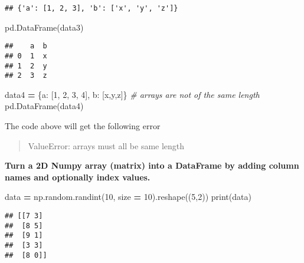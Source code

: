 \documentclass[
]{book}
\newenvironment{Shaded}{\begin{snugshade}}{\end{snugshade}}
\newcommand{\BuiltInTok}[1]{#1}
\newcommand{\CommentTok}[1]{\textcolor[rgb]{0.56,0.35,0.01}{\textit{#1}}}
\newcommand{\DecValTok}[1]{\textcolor[rgb]{0.00,0.00,0.81}{#1}}
\newcommand{\NormalTok}[1]{#1}
\newcommand{\OperatorTok}[1]{\textcolor[rgb]{0.81,0.36,0.00}{\textbf{#1}}}
\newcommand{\StringTok}[1]{\textcolor[rgb]{0.31,0.60,0.02}{#1}}
\begin{document}
\begin{verbatim}
## {'a': [1, 2, 3], 'b': ['x', 'y', 'z']}
\end{verbatim}

\begin{Shaded}
\begin{Highlighting}[]
\NormalTok{pd.DataFrame(data3)}
\end{Highlighting}
\end{Shaded}

\begin{verbatim}
##    a  b
## 0  1  x
## 1  2  y
## 2  3  z
\end{verbatim}

\begin{Shaded}
\begin{Highlighting}[]
\NormalTok{data4 }\OperatorTok{=}\NormalTok{ \{}\StringTok{\textquotesingle{}a\textquotesingle{}}\NormalTok{: [}\DecValTok{1}\NormalTok{, }\DecValTok{2}\NormalTok{, }\DecValTok{3}\NormalTok{, }\DecValTok{4}\NormalTok{], }\StringTok{\textquotesingle{}b\textquotesingle{}}\NormalTok{: [}\StringTok{\textquotesingle{}x\textquotesingle{}}\NormalTok{,}\StringTok{\textquotesingle{}y\textquotesingle{}}\NormalTok{,}\StringTok{\textquotesingle{}z\textquotesingle{}}\NormalTok{]\} }\CommentTok{\# arrays are not of the same length}
\NormalTok{pd.DataFrame(data4)}
\end{Highlighting}
\end{Shaded}

The code above will get the following error

\begin{quote}
ValueError: arrays must all be same length
\end{quote}

\textbf{Turn a 2D Numpy array (matrix) into a DataFrame by adding column names and optionally
index values.}

\begin{Shaded}
\begin{Highlighting}[]
\NormalTok{data }\OperatorTok{=}\NormalTok{ np.random.randint(}\DecValTok{10}\NormalTok{, size }\OperatorTok{=} \DecValTok{10}\NormalTok{).reshape((}\DecValTok{5}\NormalTok{,}\DecValTok{2}\NormalTok{))}
\BuiltInTok{print}\NormalTok{(data)}
\end{Highlighting}
\end{Shaded}

\begin{verbatim}
## [[7 3]
##  [8 5]
##  [9 1]
##  [3 3]
##  [8 0]]
\end{verbatim}
\end{document}
